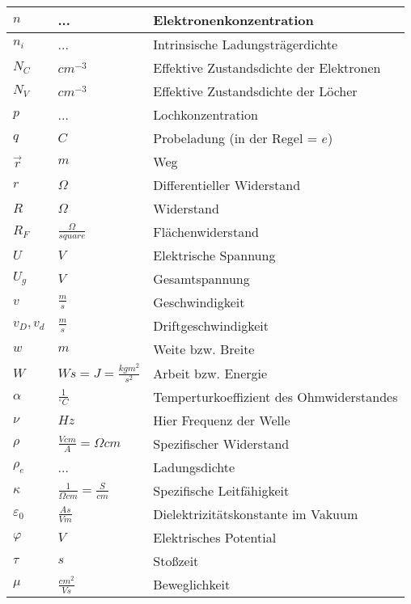 \documentclass[12pt,a4paper]{report}%
\numberwithin{equation}{section}
\begin{document}
\begin{longtable} {|p{2cm}|p{3cm}|p{8.4cm}|}
	$n$ & ... & Elektronenkonzentration \\ \hline
	$n_i$ & ... & Intrinsische Ladungsträgerdichte \\ \hline
	$N_C$ & $cm^{-3}$ & Effektive Zustandsdichte der Elektronen \\ \hline
	$N_V$ & $cm^{-3}$ & Effektive Zustandsdichte der Löcher \\ \hline
	$p$ & ... & Lochkonzentration \\ \hline
	$q$ & $C$ & Probeladung (in der Regel = $e$) \\ \hline
	$\vec{r}$ & $m$ & Weg \\ \hline
	$r$ & $\Omega$ & Differentieller Widerstand \\ \hline
	$R$ & $\Omega$ & Widerstand \\ \hline
	$R_F$ & $\frac{\Omega}{square}$ & Flächenwiderstand \\ \hline 
	$U$ & $V$ & Elektrische Spannung \\ \hline
	$U_g$ & $V$ & Gesamtspannung \\ \hline
	 
	$v$ & $\frac{m}{s}$ & Geschwindigkeit \\ \hline
	$v_D, v_d$ & $\frac{m}{s}$ & Driftgeschwindigkeit \\ \hline
	$w$ & $m$ & Weite bzw. Breite  \\ \hline
	$W$ & $Ws = J = \frac{kgm^2}{s^2}$ & Arbeit bzw. Energie \\ \hline
	
	$\alpha$ & $\frac{1}{^{\circ} C}$ & Temperturkoeffizient des Ohmwiderstandes \\ \hline
	$\nu$ & $Hz$ & Hier Frequenz der Welle \\ \hline
	$\rho$ & $\frac{V cm}{A} = \Omega  cm$ & Spezifischer Widerstand \\ \hline
	$\rho_e$ & ... & Ladungsdichte \\ \hline
	$\kappa$ & $\frac{1}{\Omega cm} = \frac{S}{cm}$ & Spezifische Leitfähigkeit \\ \hline
	$\varepsilon_0$ & $\frac{As}{Vm}$ & Dielektrizitätskonstante im Vakuum \\ \hline
	$\varphi$ & $V$ & Elektrisches Potential \\ \hline
	$\tau$ & $s$ & Stoßzeit \\ \hline
	$\mu$ & $\frac{cm^2}{Vs}$ & Beweglichkeit \\ \hline
	\end{longtable}
	\renewcommand{\arraystretch}{1}
	
\end{document}
